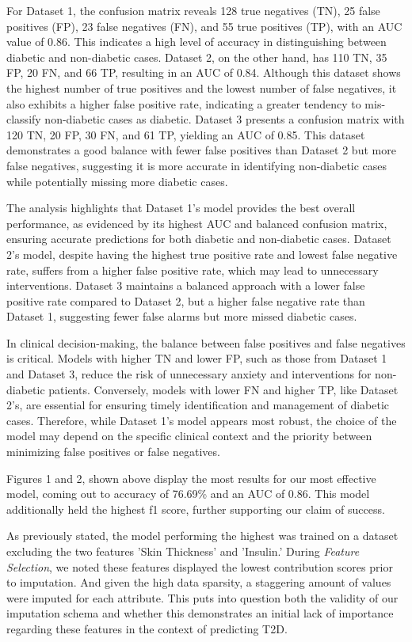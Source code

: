 \documentclass[journal]{IEEEtran}
\begin{document}
For Dataset 1, the confusion matrix reveals 128 true negatives (TN), 25 false positives (FP), 23 false negatives (FN), and 55 true positives (TP), with an AUC value of 0.86. This indicates a high level of accuracy in distinguishing between diabetic and non-diabetic cases. Dataset 2, on the other hand, has 110 TN, 35 FP, 20 FN, and 66 TP, resulting in an AUC of 0.84. Although this dataset shows the highest number of true positives and the lowest number of false negatives, it also exhibits a higher false positive rate, indicating a greater tendency to mis-classify non-diabetic cases as diabetic. Dataset 3 presents a confusion matrix with 120 TN, 20 FP, 30 FN, and 61 TP, yielding an AUC of 0.85. This dataset demonstrates a good balance with fewer false positives than Dataset 2 but more false negatives, suggesting it is more accurate in identifying non-diabetic cases while potentially missing more diabetic cases.

The analysis highlights that Dataset 1's model provides the best overall performance, as evidenced by its highest AUC and balanced confusion matrix, ensuring accurate predictions for both diabetic and non-diabetic cases. Dataset 2's model, despite having the highest true positive rate and lowest false negative rate, suffers from a higher false positive rate, which may lead to unnecessary interventions. Dataset 3 maintains a balanced approach with a lower false positive rate compared to Dataset 2, but a higher false negative rate than Dataset 1, suggesting fewer false alarms but more missed diabetic cases.

In clinical decision-making, the balance between false positives and false negatives is critical. Models with higher TN and lower FP, such as those from Dataset 1 and Dataset 3, reduce the risk of unnecessary anxiety and interventions for non-diabetic patients. Conversely, models with lower FN and higher TP, like Dataset 2's, are essential for ensuring timely identification and management of diabetic cases. Therefore, while Dataset 1's model appears most robust, the choice of the model may depend on the specific clinical context and the priority between minimizing false positives or false negatives.

Figures 1 and 2, shown above display the most results for our most effective model, coming out to accuracy of 76.69\% and an AUC of 0.86. This model additionally held the highest f1 score, further supporting our claim of success. 

As previously stated, the model performing the highest was trained on a dataset excluding the two features 'Skin Thickness' and 'Insulin.' During \textit{Feature Selection}, we noted these features displayed the lowest contribution scores prior to imputation. And given the high data sparsity, a staggering amount of values were imputed for each attribute. This puts into question both the validity of our imputation schema and whether this demonstrates an initial lack of importance regarding these features in the context of predicting T2D.
\end{document}
